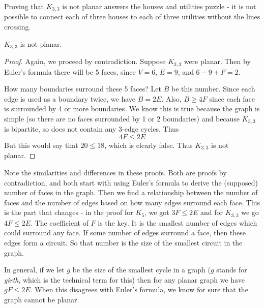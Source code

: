\documentclass[12pt]{article}
\begin{document}
Proving that $K_{3,3}$ is not planar answers the houses and utilities puzzle - it is not possible to connect each of three houses to each of three utilities without the lines crossing.

\begin{theorem}
  $K_{3,3}$ is not planar.
\end{theorem}

\begin{proof}
  Again, we proceed by contradiction.  Suppose $K_{3,3}$ were planar.  Then by Euler's formula there will be 5 faces, since $V = 6$, $E = 9$, and $6 - 9 + F = 2$.
  
  How many boundaries surround these 5 faces?  Let $B$ be this number.  Since each edge is used as a boundary twice, we have $B = 2E$.  Also, $B \ge 4F$ since each face is surrounded by 4 or more boundaries.  We know this is true because the graph is simple (so there are no faces surrounded by 1 or 2 boundaries) and because $K_{3,3}$ is bipartite, so does not contain any 3-edge cycles.  Thus
  \[4F \le 2E\]
  But this would say that $20 \le 18$, which is clearly false.  Thus $K_{3,3}$ is not planar.
\end{proof}

Note the similarities and differences in these proofs.  Both are proofs by contradiction, and both start with using Euler's formula to derive the (supposed) number of faces in the graph.  Then we find a relationship between the number of faces and the number of edges based on how many edges surround each face.  This is the part that changes - in the proof for $K_5$, we got $3F \le 2E$ and for $K_{3,3}$ we go $4F \le 2E$.  The coefficient of $F$ is the key.  It is the smallest number of edges which could surround any face.  If some number of edges surround a face, then these edges form a circuit.  So that number is the size of the smallest circuit in the graph.

In general, if we let $g$ be the size of the smallest cycle in a graph ($g$ stands for {\em girth}, which is the technical term for this) then for any planar graph we have $gF \le 2E$.  When this disagrees with Euler's formula, we know for sure that the graph cannot be planar.
\end{document}
